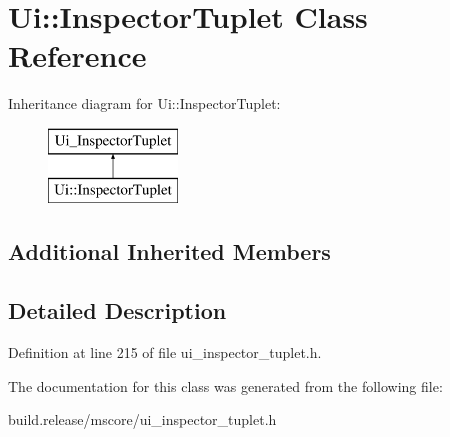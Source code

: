 \hypertarget{class_ui_1_1_inspector_tuplet}{}\section{Ui\+:\+:Inspector\+Tuplet Class Reference}
\label{class_ui_1_1_inspector_tuplet}
Inheritance diagram for Ui\+:\+:Inspector\+Tuplet\+:\begin{figure}[H]
\begin{center}
\leavevmode
\includegraphics[height=2.000000cm]{class_ui_1_1_inspector_tuplet}
\end{center}
\end{figure}
\subsection*{Additional Inherited Members}


\subsection{Detailed Description}


Definition at line 215 of file ui\+\_\+inspector\+\_\+tuplet.\+h.



The documentation for this class was generated from the following file\+:\begin{DoxyCompactItemize}
\item 
build.\+release/mscore/ui\+\_\+inspector\+\_\+tuplet.\+h\end{DoxyCompactItemize}
